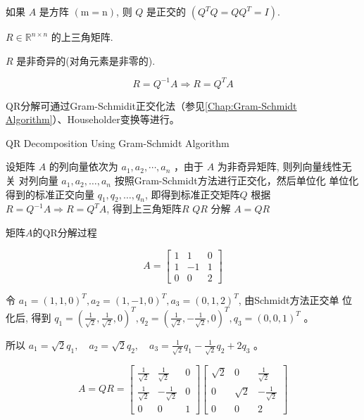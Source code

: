 \begin{corollary}
    如果 $ A $ 是方阵 $ (\mathrm{m}=\mathrm{n}) $, 则 $ Q $ 是正交的 $ \left(Q^{T} Q=Q Q^{T}=I\right) $.
\end{corollary}

\begin{corollary}
    $ R \in \mathbb{R}^{n \times n} $ 的上三角矩阵.
\end{corollary}

\begin{corollary}
     $ R $ 是非奇异的(对角元素是非零的).
\end{corollary}

\begin{corollary}
    $$ R=Q^{-1} A \Rightarrow R=Q^{T} A $$
\end{corollary}

QR分解可通过Gram-Schmidit正交化法（参见\ref{Chap:Gram-Schmidt Algorithm}）、Householder变换等进行。


\begin{algorithm}[htbp]
    \caption{QR Decomposition Using Gram-Schmidt Algorithm}
    
    设矩阵 $ A $ 的列向量依次为 $ a_{1}, a_{2}, \cdots, a_{n} $ ，由于 $ A $ 为非奇异矩阵, 则列向量线性无关\;
    对列向量 $ a_{1}, a_{2}, \ldots, a_{n} $ 按照Gram-Schmidt方法进行正交化，然后单位化\;
    单位化得到的标准正交向量 $ q_{1}, q_{2}, \ldots, q_{n} $, 即得到标准正交矩阵$Q$\;
    根据 $ R=Q^{-1} A \Rightarrow R=Q^{T} A $, 得到上三角矩阵$R$\;
    $ Q R $ 分解 $ A=Q R $\;
\end{algorithm}

\begin{example}
    矩阵$A$的QR分解过程

    $$ A=\left[\begin{array}{ccc}1 & 1 & 0 \\ 1 & -1 & 1 \\ 0 & 0 & 2\end{array}\right] $$

    令 $ a_{1}=(1,1,0)^{T}, a_{2}=(1,-1,0)^{T}, a_{3}=(0,1,2)^{T} $, 由Schmidt方法正交单 位化后, 得到 $ q_{1}=\left(\frac{1}{\sqrt{2}}, \frac{1}{\sqrt{2}}, 0\right)^{T}, q_{2}=\left(\frac{1}{\sqrt{2}},-\frac{1}{\sqrt{2}}, 0\right)^{T}, q_{3}=(0,0,1)^{T} $ 。

    所以 $ a_{1}=\sqrt{2} q_{1}, \quad a_{2}=\sqrt{2} q_{2}, \quad a_{3}=\frac{1}{\sqrt{2}} q_{1}-\frac{1}{\sqrt{2}} q_{2}+2 q_{3} $ 。

    $$ A=Q R=\left[\begin{array}{ccc}\frac{1}{\sqrt{2}} & \frac{1}{\sqrt{2}} & 0 \\ \frac{1}{\sqrt{2}} & -\frac{1}{\sqrt{2}} & 0 \\ 0 & 0 & 1\end{array}\right]\left[\begin{array}{ccc}\sqrt{2} & 0 & \frac{1}{\sqrt{2}} \\ 0 & \sqrt{2} & -\frac{1}{\sqrt{2}} \\ 0 & 0 & 2\end{array}\right] $$

\end{example}


